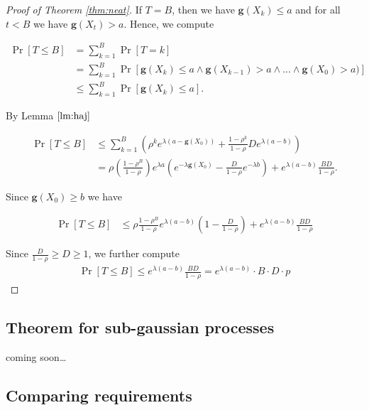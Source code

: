 \documentclass[12pt, a4paper]{article}
\newcommand{\gfun}{\mathbf{g}}
\theoremstyle{remark}
\newcommand{\cm}{coming soon\dots}
\begin{document}
\begin{proof}[Proof of Theorem \ref{thm:neat}]

    If $T = B$, then we have $\gfun(X_k) \leq a$ and for all $t < B$ we have $\gfun(X_t) > a$. Hence, we compute

    \begin{align*}
        \Pr[T \leq B] & = \sum_{k=1}^{B} \Pr[T = k]                                                                        \\
                      & = \sum_{k=1}^{B} \Pr[\gfun(X_k) \leq a \land \gfun(X_{k - 1}) > a \land ... \land \gfun(X_0) > a)] \\
                      & \leq \sum_{k=1}^{B} \Pr[\gfun(X_k) \leq a].
    \end{align*}

    By Lemma $\ref{lm:haj}$

    \begin{align*}
        \Pr[T \leq B] & \leq \sum_{k=1}^{B} \left(\rho^k e^{\lambda(a - \gfun(X_0))} + \frac{1 - \rho^k}{1 - \rho} D e^{\lambda(a - b)}\right)                                                          \\
                      & = \rho \left(\frac{1 - \rho^B}{1 - \rho}\right) e^{\lambda a}\left(e^{-\lambda\gfun(X_0)} - \frac{D}{1 - \rho} e^{-\lambda b}\right) + e^{\lambda(a - b)} \frac{B D}{1 - \rho}.
    \end{align*}

    Since $\gfun(X_0) \ge b$ we have

    \begin{align*}
        \Pr[T \leq B] & \leq \rho \frac{1 - \rho^B}{1 - \rho} e^{\lambda (a - b)}\left(1 - \frac{D}{1 - \rho}\right) + e^{\lambda(a - b)} \frac{B D}{1 - \rho}
    \end{align*}

    Since $\frac{D}{1 - \rho} \geq D \geq 1 $, we further compute
    \begin{align*}
        \Pr[T \leq B] \leq e^{\lambda(a - b)} \frac{B D}{1 - \rho} = e^{\lambda(a - b)} \cdot B \cdot D \cdot p
    \end{align*}

\end{proof}
\subsection{Theorem for sub-gaussian processes}
\cm
\subsection{Comparing requirements}
\label{sec:compare}
\end{document}
